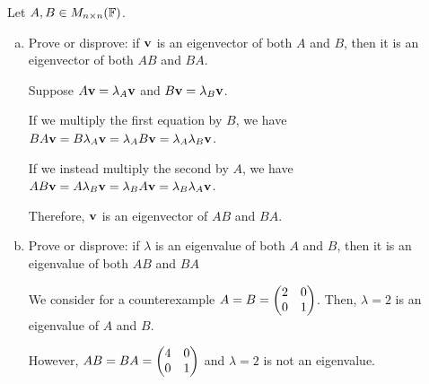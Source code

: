 \documentclass{agony}
\begin{document}
\begin{prob}
  Let $A, B \in M_{n \times n}(\mathbb{F})$.
\end{prob}
\begin{enumerate}[(a)]
  \item Prove or disprove: if $\vb v$ is an eigenvector of both $A$ and $B$,
        then it is an eigenvector of both $A B$ and $B A$.
        \begin{prf}
          Suppose $A\vb v = \lambda_A \vb v$ and $B\vb v = \lambda_B \vb v$.

          If we multiply the first equation by $B$,
          we have $BA\vb v = B\lambda_A \vb v = \lambda_A B\vb v = \lambda_A \lambda_B \vb v$.

          If we instead multiply the second by $A$,
          we have $AB\vb v = A\lambda_B \vb v = \lambda_B A\vb v = \lambda_B \lambda_A \vb v$.

          Therefore, $\vb v$ is an eigenvector of $AB$ and $BA$.
        \end{prf}
  \item Prove or disprove: if $\lambda$ is an eigenvalue of both $A$ and $B$,
        then it is an eigenvalue of both $A B$ and $B A$
        \begin{sol}
          We consider for a counterexample $A = B = \mqty(2&0\\0&1)$.
          Then, $\lambda = 2$ is an eigenvalue of $A$ and $B$.

          However, $AB = BA = \mqty(4&0\\0&1)$ and $\lambda = 2$ is not an eigenvalue.
        \end{sol}
\end{enumerate}
\end{document}
